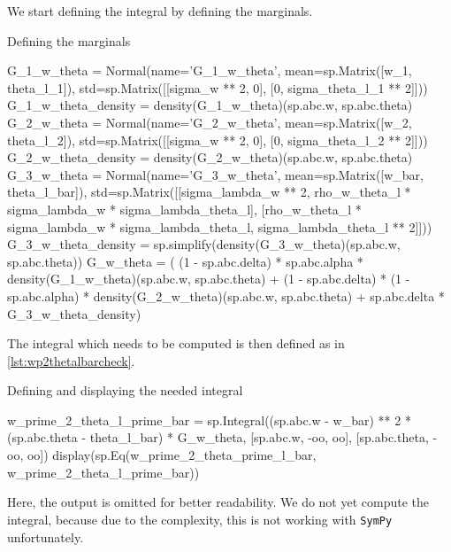 \noindent
We start defining the integral by defining the marginals.
\begin{listing}[!ht]
    \caption{Defining the marginals}
    \label{lst:defmarginalsnum}
    \begin{pythoncode}
        G_1_w_theta = Normal(name='G_1_w_theta', mean=sp.Matrix([w_1, theta_l_1]),
            std=sp.Matrix([[sigma_w ** 2, 0], [0, sigma_theta_l_1 ** 2]]))
        G_1_w_theta_density = density(G_1_w_theta)(sp.abc.w, sp.abc.theta)
        G_2_w_theta = Normal(name='G_2_w_theta', mean=sp.Matrix([w_2, theta_l_2]),
            std=sp.Matrix([[sigma_w ** 2, 0], [0, sigma_theta_l_2 ** 2]]))
        G_2_w_theta_density = density(G_2_w_theta)(sp.abc.w, sp.abc.theta)
        G_3_w_theta = Normal(name='G_3_w_theta', mean=sp.Matrix([w_bar, theta_l_bar]),
            std=sp.Matrix([[sigma_lambda_w ** 2, 
                rho_w_theta_l * sigma_lambda_w * sigma_lambda_theta_l], 
                [rho_w_theta_l * sigma_lambda_w * sigma_lambda_theta_l, 
                sigma_lambda_theta_l ** 2]]))
        G_3_w_theta_density = sp.simplify(density(G_3_w_theta)(sp.abc.w, sp.abc.theta))
        G_w_theta = (
        (1 - sp.abc.delta) * sp.abc.alpha * density(G_1_w_theta)(sp.abc.w, sp.abc.theta) 
        + (1 - sp.abc.delta) * (1 - sp.abc.alpha) * density(G_2_w_theta)(sp.abc.w, sp.abc.theta) 
        + sp.abc.delta * G_3_w_theta_density)
    \end{pythoncode}
\end{listing}

\noindent
The integral which needs to be computed is then defined as in \cref{lst:wp2thetalbarcheck}.
\begin{listing}[!ht]
    \caption{Defining and displaying the needed integral}
    \label{lst:wp2thetalbarcheck}
    \begin{pythoncode}
        w_prime_2_theta_l_prime_bar = sp.Integral((sp.abc.w - w_bar) ** 2 * 
            (sp.abc.theta - theta_l_bar) * G_w_theta, 
            [sp.abc.w, -oo, oo], [sp.abc.theta, -oo, oo])
        display(sp.Eq(w_prime_2_theta_prime_l_bar, w_prime_2_theta_l_prime_bar))
    \end{pythoncode}
\end{listing}

\noindent
Here, the output is omitted for better readability.
We do not yet compute the integral, because due to the complexity, this is not working with \texttt{SymPy} unfortunately.

